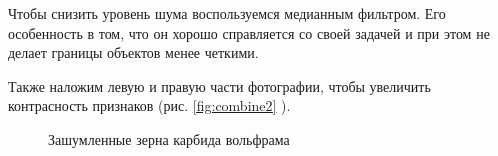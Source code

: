 \documentclass[a4paper, 14pt]{article}
\begin{document}
	Чтобы снизить уровень шума воспользуемся медианным фильтром. Его особенность в том, что он хорошо справляется со своей задачей и при этом не делает границы объектов менее четкими. 
	
	Также наложим левую и правую части фотографии, чтобы увеличить контрасность признаков (рис. \ref{fig:combine2} ).
	

	\begin{figure}[h]
	\begin{center}
		\begin{minipage}[h]{0.4\linewidth}
		\caption{Зашумленные зерна карбида вольфрама}
		\label{ris:noise}
		\end{minipage}
		\hfill
		\begin{minipage}[h]{0.4\linewidth}

\end{minipage}
\end{center}
\end{figure}
\end{document}

